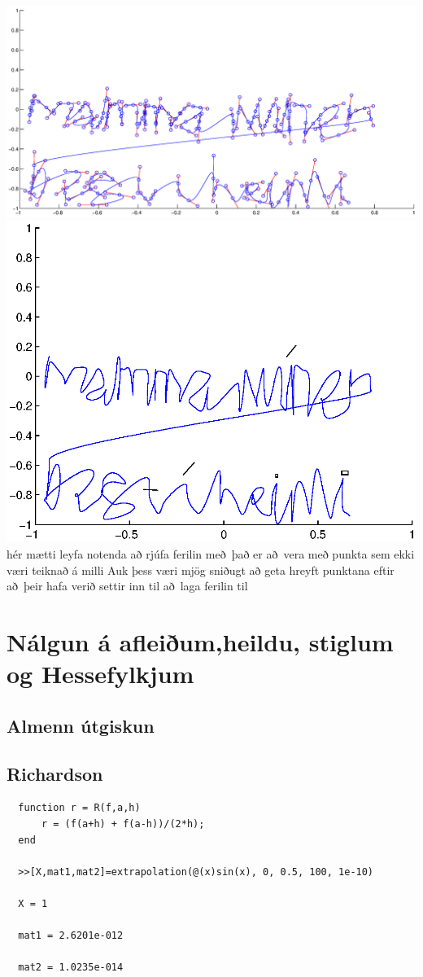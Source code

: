 \documentclass[a4]{article}
\begin{document}
\includegraphics[width=\textwidth]{mamma1.eps}\\
\includegraphics[height=0.495\textheight]{mamma2.eps}\\
hér mætti leyfa notenda að rjúfa ferilin með það er að vera með punkta sem ekki væri teiknað á milli 
Auk þess væri mjög sniðugt að geta hreyft punktana eftir að þeir hafa verið settir inn til að laga ferilin til
\section{Nálgun á afleiðum,heildu, stiglum og Hessefylkjum}
\subsection{Almenn útgiskun}

\subsection{Richardson}
\begin{lstlisting}
  function r = R(f,a,h)
      r = (f(a+h) + f(a-h))/(2*h);
  end

  >>[X,mat1,mat2]=extrapolation(@(x)sin(x), 0, 0.5, 100, 1e-10)

  X = 1 

  mat1 = 2.6201e-012

  mat2 = 1.0235e-014 
\end{lstlisting}
\end{document}
